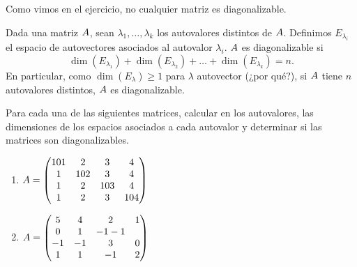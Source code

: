 %
%
%
%
%
%
%
%
%
%

Como vimos en el ejercicio, no cualquier matriz es diagonalizable.

Dada una matriz $\Ab$, sean $\lambda_1, \dots, \lambda_k$ los autovalores
distintos de $\Ab$. Definimos $E_{\lambda_i}$ el espacio de autovectores
asociados al autovalor $\lambda_i$. $\Ab$ es diagonalizable si
$$
\dim(E_{\lambda_1}) + \dim(E_{\lambda_2}) + \dots +\dim(E_{\lambda_k}) = n.
$$
En particular, como $\dim(E_\lambda) \ge 1$ para $\lambda$ autovector
(¿por qué?), si $\Ab$ tiene $n$ autovalores distintos, $\Ab$ es
diagonalizable.

\begin{ejercicio}
Para cada una de las siguientes matrices, calcular en \python los
autovalores, las dimensiones de los espacios asociados a cada autovalor
y determinar si las matrices son diagonalizables.

\begin{enumerate}
\item   $\Ab = \begin{pmatrix} 101 & 2 & 3 & 4 \\ 1 & 102 & 3 & 4 \\ 1 & 2 & 103 & 4 \\ 1 & 2 & 3 & 104 \end{pmatrix}$
\item   $\Ab = \begin{pmatrix} 5 & 4 & 2 & 1 \\ 0 & 1 & -1 -1 \\ -1 &-1 &3 & 0 \\ 1 & 1 & -1 & 2 \end{pmatrix}$
\end{enumerate}


\end{ejercicio}

